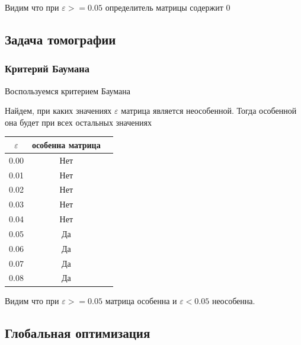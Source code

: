 \documentclass[12pt,a4paper]{article}
\begin{document}
            Видим что при $\varepsilon >= 0.05 $ определитель матрицы содержит 0
                
            
            
            
        	
		\subsection{Задача томографии}
    		\subsubsection{Критерий Баумана}
    		    Воспользуемся критерием Баумана
                
                Найдем, при каких значениях $\varepsilon$ матрица является неособенной. Тогда особенной она будет при всех остальных значениях
                \begin{center}
                    \begin{tabular}{ |c|c|c| } 
                         \hline
                         $ \varepsilon$ & особенна матрица \\ 
                         \hline
                         0.00 & Нет \\ 
                         0.01 & Нет \\ 
                         0.02 & Нет \\ 
                         0.03 & Нет \\ 
                         0.04 & Нет \\ 
                         0.05 & Да \\ 
                         0.06 & Да \\ 
                         0.07 & Да \\ 
                         0.08 & Да \\ 
                         \hline
                    \end{tabular}
                \end{center}

                Видим что при $\varepsilon >= 0.05 $ матрица особенна и $\varepsilon < 0.05 $ неособенна.
                
                
    		  
    	\newpage	    
    		    
    		    
	    \subsection{Глобальная оптимизация}
\end{document}
